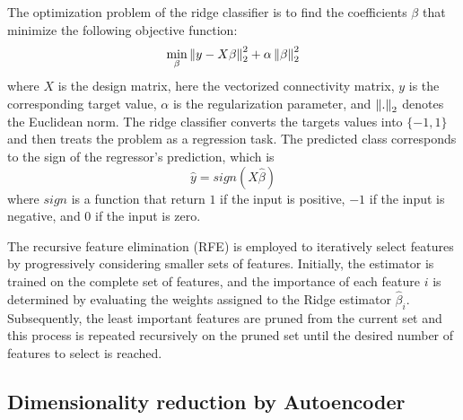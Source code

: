 The optimization problem of the ridge classifier is to find the coefficients $\beta$ that minimize the following objective function:
$$
\min_{\beta} \left\lVert y - X\beta\right\rVert_2^2 + \alpha \left\lVert\beta\right\rVert_2^2
$$
where $X$ is the design matrix, here the vectorized connectivity matrix, $y$ is the corresponding target value, $\alpha$ is the regularization parameter, and $\left\lVert.\right\rVert_2$ denotes the Euclidean norm. The ridge classifier converts the targets values into $\{-1, 1\}$ and then treats the problem as a regression task. The predicted class corresponds to the sign of the regressor's prediction, which is
$$
\hat{y} = sign(X\hat{\beta})
$$
where $sign$ is a function that return $1$ if the input is positive, $-1$ if the input is negative, and $0$ if the input is zero.

The recursive feature elimination (RFE) is employed to iteratively select features by progressively considering smaller sets of features. Initially, the estimator is trained on the complete set of features, and the importance of each feature $i$ is determined by evaluating the weights assigned to the Ridge estimator $\hat{\beta}_i$. Subsequently, the least important features are pruned from the current set and this process is repeated recursively on the pruned set until the desired number of features to select is reached.

\subsection{Dimensionality reduction by Autoencoder}

